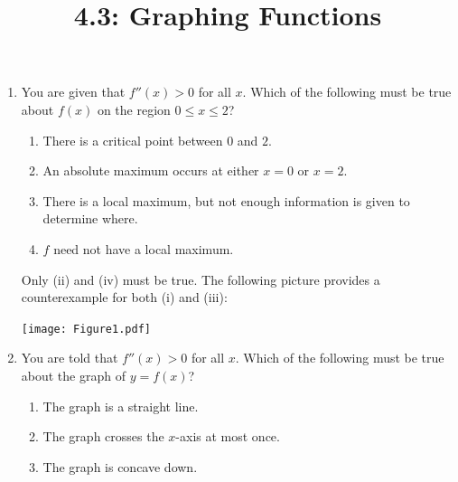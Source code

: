 \documentclass[nooutcomes,handout]{ximera}
\title{4.3: Graphing Functions}
\begin{document}
\begin{abstract}
\end{abstract}
\maketitle

\begin{problem}
  \mbox{}
  \begin{enumerate}
    \item
      You are given that $f''(x) > 0$ for all $x$.
      Which of the following must be true about $f(x)$ on the region $0 \leq x \leq 2$?
      \begin{enumerate}
        \item
          There is a critical point between $0$ and $2$.

        \item
          An absolute maximum occurs at either $x=0$ or $x=2$.

        \item
          There is a local maximum, but not enough information is given to determine where.

        \item
          $f$ need not have a local maximum.
      \end{enumerate}
      \begin{freeResponse}
        Only (ii) and (iv) must be true.
        The following picture provides a counterexample for both (i) and (iii):
        \begin{image}
          \texttt{[image: Figure1.pdf]}
        \end{image}
      \end{freeResponse}
		
     \item
       You are told that $f''(x) > 0$ for all $x$.
       Which of the following must be true about the graph of $y=f(x)$?
       \begin{enumerate}
         \item
           The graph is a straight line.

         \item 
           The graph crosses the $x$-axis at most once.
         
         \item
           The graph is concave down.


\end{enumerate}
\end{enumerate}
\end{problem}
\end{document}

